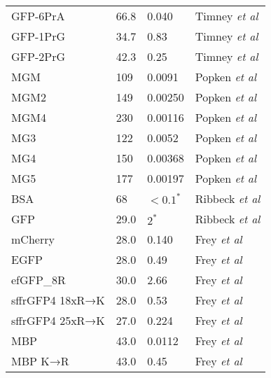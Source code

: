 \documentclass[10pt, a4paper, twocolumn]{article}
\begin{document}
\begin{table*}[h]
\begin{minipage}{0.48\linewidth}
{\begin{tabular}{p{3cm}|p{1cm}|p{2cm}|p{2.6cm}}
GFP-6PrA & 66.8 & 0.040 & Timney \textit{et al} \\
GFP-1PrG & 34.7 & 0.83 & Timney \textit{et al} \\
GFP-2PrG & 42.3 & 0.25 & Timney \textit{et al} \\
MGM & 109 & 0.0091 & Popken \textit{et al} \\
MGM2 & 149 & 0.00250 & Popken \textit{et al} \\
MGM4 & 230 & 0.00116 & Popken \textit{et al} \\
MG3 & 122 & 0.0052 & Popken \textit{et al} \\
MG4 & 150 & 0.00368 & Popken \textit{et al} \\
MG5 & 177 & 0.00197 & Popken \textit{et al} \\
BSA & 68 & $<0.1^{*}$ & Ribbeck \textit{et al} \\
GFP & 29.0 & $2^{*}$ & Ribbeck \textit{et al} \\
mCherry & 28.0 & 0.140 & Frey \textit{et al} \\
EGFP & 28.0 & 0.49 & Frey \textit{et al} \\
efGFP\_8R & 30.0 & 2.66 & Frey \textit{et al} \\
sffrGFP4 18xR→K & 28.0 & 0.53 & Frey \textit{et al} \\
sffrGFP4 25xR→K & 27.0 & 0.224 & Frey \textit{et al} \\
MBP & 43.0 & 0.0112 & Frey \textit{et al} \\
MBP K→R & 43.0 & 0.45 & Frey \textit{et al} \\
\end{tabular}
}
\label{tbl:inert_probes}
\end{minipage}
\end{table*}
\end{document}
